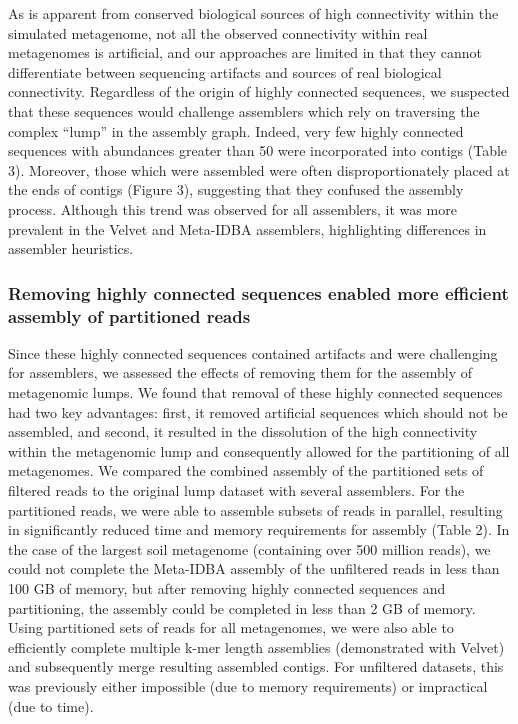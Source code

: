 \documentclass[10pt]{article}
\begin{document}
As is apparent from conserved biological sources of high connectivity
within the simulated metagenome, not all the observed connectivity
within real metagenomes is artificial, and our approaches are limited
in that they cannot differentiate between sequencing artifacts and
sources of real biological connectivity.  Regardless of the origin of
highly connected sequences, we suspected that these sequences would
challenge assemblers which rely on traversing the complex ``lump'' in
the assembly graph.  Indeed, very few highly connected sequences with
abundances greater than 50 were incorporated into contigs (Table
3). Moreover, those which were assembled were often disproportionately placed
at the ends of contigs (Figure 3), suggesting that they confused the
assembly process.  Although this trend was
observed for all assemblers, it was more prevalent in the Velvet and
Meta-IDBA assemblers, highlighting differences in assembler
heuristics.

\subsubsection*{Removing highly connected sequences enabled more efficient assembly of partitioned reads}

Since these highly connected sequences contained artifacts and 
were challenging for assemblers,
we assessed the
effects of removing them for the assembly of metagenomic lumps.  We
found that removal of these highly connected sequences had two key
advantages: first, it removed artificial sequences which should not be
assembled, and second, it resulted in the dissolution of the high
connectivity within the metagenomic lump and consequently allowed for
the partitioning of all metagenomes.  We compared the combined
assembly of the partitioned sets of filtered reads to the original
lump dataset with several assemblers.  For the partitioned reads, we
were able to assemble subsets of reads in parallel, resulting in
significantly reduced time and memory requirements for assembly (Table
2).  In the case of the largest soil metagenome (containing over 500
million reads), we could not complete the Meta-IDBA assembly of the
unfiltered reads in less than 100 GB of memory, but after removing
highly connected sequences and partitioning, the assembly could be
completed in less than 2 GB of memory.  Using partitioned sets of
reads for all metagenomes, we were also able to efficiently complete
multiple k-mer length assemblies (demonstrated with Velvet) and
subsequently merge resulting assembled contigs.  For unfiltered
datasets, this was previously either impossible (due to memory
requirements) or impractical (due to time).
\end{document}
